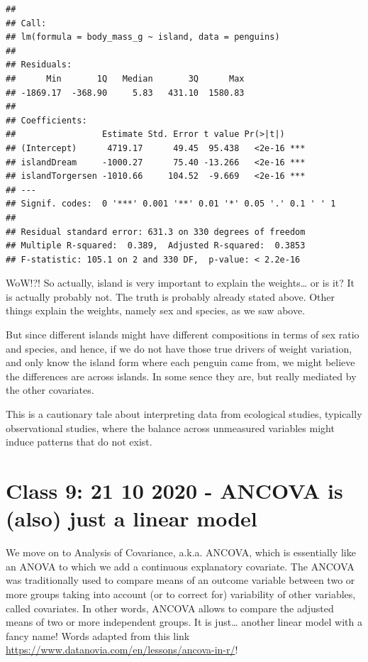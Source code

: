 \documentclass[
]{book}
\begin{document}
\begin{verbatim}
## 
## Call:
## lm(formula = body_mass_g ~ island, data = penguins)
## 
## Residuals:
##      Min       1Q   Median       3Q      Max 
## -1869.17  -368.90     5.83   431.10  1580.83 
## 
## Coefficients:
##                 Estimate Std. Error t value Pr(>|t|)    
## (Intercept)      4719.17      49.45  95.438   <2e-16 ***
## islandDream     -1000.27      75.40 -13.266   <2e-16 ***
## islandTorgersen -1010.66     104.52  -9.669   <2e-16 ***
## ---
## Signif. codes:  0 '***' 0.001 '**' 0.01 '*' 0.05 '.' 0.1 ' ' 1
## 
## Residual standard error: 631.3 on 330 degrees of freedom
## Multiple R-squared:  0.389,  Adjusted R-squared:  0.3853 
## F-statistic: 105.1 on 2 and 330 DF,  p-value: < 2.2e-16
\end{verbatim}

WoW!?! So actually, island is very important to explain the weights\ldots{} or is it? It is actually probably not. The truth is probably already stated above. Other things explain the weights, namely sex and species, as we saw above.

But since different islands might have different compositions in terms of sex ratio and species, and hence, if we do not have those true drivers of weight variation, and only know the island form where each penguin came from, we might believe the differences are across islands. In some sence they are, but really mediated by the other covariates.

This is a cautionary tale about interpreting data from ecological studies, typically observational studies, where the balance across unmeasured variables might induce patterns that do not exist.

\hypertarget{aula9}{%
\chapter{Class 9: 21 10 2020 - ANCOVA is (also) just a linear model}\label{aula9}}

We move on to Analysis of Covariance, a.k.a. ANCOVA, which is essentially like an ANOVA to which we add a continuous explanatory covariate. The ANCOVA was traditionally used to compare means of an outcome variable between two or more groups taking into account (or to correct for) variability of other variables, called covariates. In other words, ANCOVA allows to compare the adjusted means of two or more independent groups. It is just\ldots{} another linear model with a fancy name! Words adapted from this link \url{https://www.datanovia.com/en/lessons/ancova-in-r/}!
\end{document}
